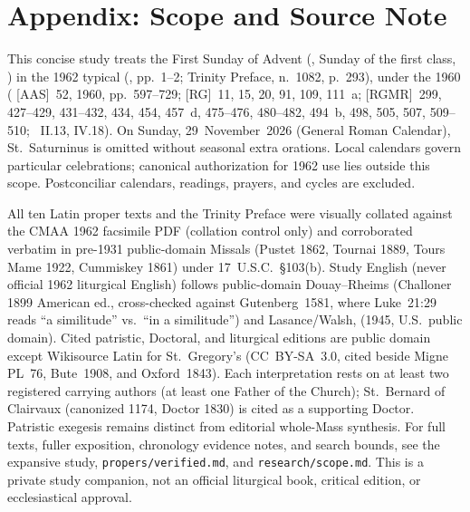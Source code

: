 \section{Appendix: Scope and Source Note}

This concise study treats the First Sunday of Advent (, Sunday of the first class, ) in the 1962 typical  (, pp.~1--2; Trinity Preface, n.~1082, p.~293), under the 1960  ( [AAS]~52, 1960, pp.~597--729;  [RG]~11, 15, 20, 91, 109, 111~a;  [RGMR]~299, 427--429, 431--432, 434, 454, 457~d, 475--476, 480--482, 494~b, 498, 505, 507, 509--510; ~II.13, IV.18). On Sunday, 29~November~2026 (General Roman Calendar), St.~Saturninus is omitted without seasonal extra orations. Local calendars govern particular celebrations; canonical authorization for 1962 use lies outside this scope. Postconciliar calendars, readings, prayers, and cycles are excluded.

All ten Latin proper texts and the Trinity Preface were visually collated against the CMAA 1962 facsimile PDF (collation control only) and corroborated verbatim in pre-1931 public-domain Missals (Pustet 1862, Tournai 1889, Tours Mame 1922, Cummiskey 1861) under 17~U.S.C.~\S103(b). Study English (never official 1962 liturgical English) follows public-domain Douay--Rheims (Challoner 1899 American ed., cross-checked against Gutenberg~1581, where Luke~21:29 reads ``a similitude'' vs.\ ``in a similitude'') and Lasance/Walsh,  (1945, U.S.~public domain). Cited patristic, Doctoral, and liturgical editions are public domain except Wikisource Latin for St.~Gregory's  (CC~BY-SA~3.0, cited beside Migne PL~76, Bute~1908, and Oxford~1843). Each interpretation rests on at least two registered carrying authors (at least one Father of the Church); St.~Bernard of Clairvaux (canonized 1174, Doctor 1830) is cited as a supporting Doctor. Patristic exegesis remains distinct from editorial whole-Mass synthesis. For full texts, fuller exposition, chronology evidence notes, and search bounds, see the expansive study, \texttt{propers/verified.md}, and \texttt{research/scope.md}. This is a private study companion, not an official liturgical book, critical edition, or ecclesiastical approval.

